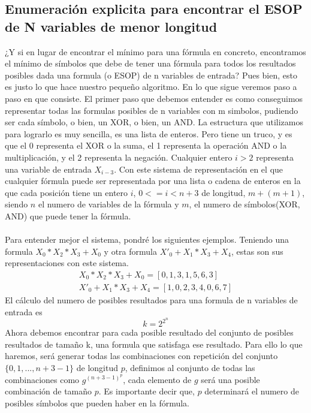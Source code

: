 \subsection{Enumeración explicita para encontrar el ESOP de N variables de menor longitud}
¿Y si en lugar de encontrar el mínimo para una fórmula en concreto, encontramos el mínimo de símbolos que debe de tener una fórmula para todos los resultados posibles dada una formula (o ESOP) de n variables de entrada? Pues bien, esto es justo lo que hace nuestro pequeño algoritmo. En lo que sigue veremos paso a paso en que consiste. El primer paso que debemos entender es como conseguimos representar todas las formulas posibles de n variables con m simbolos, pudiendo ser cada símbolo, o bien, un XOR, o bien, un AND. La estructura que utilizamos para lograrlo es muy sencilla, es una lista de enteros. Pero tiene un truco, y es que el 0 representa el XOR o la suma, el 1 representa la operación AND o la multiplicación, y el 2 representa la negación. Cualquier entero $i > 2$ representa una variable de entrada $X_{i - 3}$. Con este sistema de representación en el que cualquier fórmula puede ser representada por una lista o cadena de enteros en la que cada posición tiene un entero $i$, $0 <= i < n+3$ de longitud, $m+(m+1)$, siendo $n$ el numero de variables de la fórmula y $m$, el numero de símbolos(XOR, AND) que puede tener la fórmula. \\\\
Para entender mejor el sistema, pondré los siguientes ejemplos. Teniendo una formula $X_0 * X_2 * X_3 + X_0$ y otra formula $X'_0 + X_1 * X_3 + X_4$, estas son sus representaciones con este sistema.
\begin{align*}
X_0 * X_2 * X_3 + X_0 = [0, 1, 3, 1, 5, 6, 3] \\
X'_0 + X_1 * X_3 + X_4 = [1, 0, 2, 3, 4, 0, 6, 7]
\end{align*}
El cálculo del numero de posibles resultados para una formula de n variables de entrada es
\[k = 2^{2^{n}}\]
Ahora debemos encontrar para cada posible resultado del conjunto de posibles resultados de tamaño k, una formula que satisfaga ese resultado. Para ello lo que haremos, será generar todas las combinaciones con repetición del conjunto $\{0,1, ..., n + 3 - 1\}$ de longitud $p$, definimos al conjunto de todas las combinaciones como $g^{(n+3-1)^p}$, cada elemento de $g$ será una posible combinación de tamaño $p$. Es importante decir que, $p$ determinará el numero de posibles símbolos que pueden haber en la fórmula. \\\\
